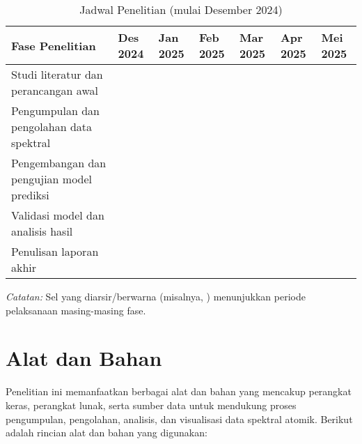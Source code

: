 \begin{table}[H] %
  \centering
  \caption{Jadwal Penelitian (mulai Desember 2024)}
  \label{tab:jadwal_penelitian_des24_berwarna} %
  \small
  \setlength{\tabcolsep}{3pt}
  \begin{tabular}{p{} *{6}{l}}
    \toprule
    \textbf{Fase Penelitian} & \textbf{Des 2024} & \textbf{Jan 2025} & \textbf{Feb 2025} & \textbf{Mar 2025} & \textbf{Apr 2025} & \textbf{Mei 2025} \\
    \midrule
    Studi literatur dan perancangan awal & & & & & & \\
    Pengumpulan dan pengolahan data spektral & \cellcolor{gray!25} & & & & & \\
    Pengembangan dan pengujian model prediksi & \cellcolor{gray!25} & \cellcolor{gray!25} & \cellcolor{gray!25} & \cellcolor{gray!25} & & \\
    Validasi model dan analisis hasil & & & & & \cellcolor{gray!25} & \cellcolor{gray!25} \\
    Penulisan laporan akhir & & & & & & \cellcolor{gray!25} \\
    \bottomrule
  \end{tabular}
  \vspace{0.2cm}
  \footnotesize
  \textit{Catatan:} Sel yang diarsir/berwarna (misalnya, \colorbox{gray!25}{\phantom{X}}\hspace{0.1em}) menunjukkan periode pelaksanaan masing-masing fase.
\end{table}

\section{Alat dan Bahan}
Penelitian ini memanfaatkan berbagai alat dan bahan yang mencakup perangkat keras, perangkat lunak, serta sumber data untuk mendukung proses pengumpulan, pengolahan, analisis, dan visualisasi data spektral atomik. Berikut adalah rincian alat dan bahan yang digunakan:


